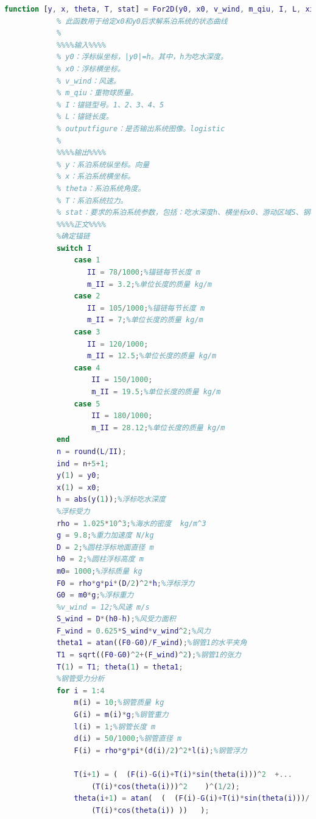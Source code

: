\documentclass[UTF8]{ctexbook}
\theoremstyle{nonumberplain}
\begin{document}
            \begin{lstlisting}[language = Matlab]
            function [y, x, theta, T, stat] = For2D(y0, x0, v_wind, m_qiu, I, L, xitong_figure)
            % 此函数用于给定x0和y0后求解系泊系统的状态曲线
            %
            %%%%输入%%%%
            % y0：浮标纵坐标，|y0|=h。其中，h为吃水深度。
            % x0：浮标横坐标。
            % v_wind：风速。
            % m_qiu：重物球质量。
            % I：锚链型号。1、2、3、4、5
            % L：锚链长度。
            % outputfigure：是否输出系统图像。logistic
            %
            %%%%输出%%%%
            % y：系泊系统纵坐标。向量
            % x：系泊系统横坐标。
            % theta：系泊系统角度。
            % T：系泊系统拉力。
            % stat：要求的系泊系统参数，包括：吃水深度h、横坐标x0、游动区域S、钢桶竖直夹角alpha1、锚链底端水平夹角alpha2、风速v_wind、重物球质量m、系统状态yxthetaT。stats
            %%%%正文%%%%
            %确定锚链
            switch I
                case 1
                   II = 78/1000;%锚链每节长度 m
                   m_II = 3.2;%单位长度的质量 kg/m
                case 2
                   II = 105/1000;%锚链每节长度 m
                   m_II = 7;%单位长度的质量 kg/m
                case 3
                   II = 120/1000;
                   m_II = 12.5;%单位长度的质量 kg/m
                case 4
                    II = 150/1000;
                    m_II = 19.5;%单位长度的质量 kg/m
                case 5
                    II = 180/1000;
                    m_II = 28.12;%单位长度的质量 kg/m
            end
            n = round(L/II);
            ind = n+5+1;
            y(1) = y0;
            x(1) = x0;
            h = abs(y(1));%浮标吃水深度
            %浮标受力
            rho = 1.025*10^3;%海水的密度  kg/m^3
            g = 9.8;%重力加速度 N/kg
            D = 2;%圆柱浮标地面直径 m
            h0 = 2;%圆柱浮标高度 m
            m0= 1000;%浮标质量 kg
            F0 = rho*g*pi*(D/2)^2*h;%浮标浮力
            G0 = m0*g;%浮标重力
            %v_wind = 12;%风速 m/s
            S_wind = D*(h0-h);%风受力面积
            F_wind = 0.625*S_wind*v_wind^2;%风力
            theta1 = atan((F0-G0)/F_wind);%钢管1的水平夹角
            T1 = sqrt((F0-G0)^2+(F_wind)^2);%钢管1的张力
            T(1) = T1; theta(1) = theta1;
            %钢管受力分析
            for i = 1:4
                m(i) = 10;%钢管质量 kg
                G(i) = m(i)*g;%钢管重力
                l(i) = 1;%钢管长度 m
                d(i) = 50/1000;%钢管直径 m
                F(i) = rho*g*pi*(d(i)/2)^2*l(i);%钢管浮力

                T(i+1) = (  (F(i)-G(i)+T(i)*sin(theta(i)))^2  +...
                    (T(i)*cos(theta(i)))^2    )^(1/2);
                theta(i+1) = atan(  (  (F(i)-G(i)+T(i)*sin(theta(i)))/...
                    (T(i)*cos(theta(i)) ))   );


\end{lstlisting}
\end{document}
